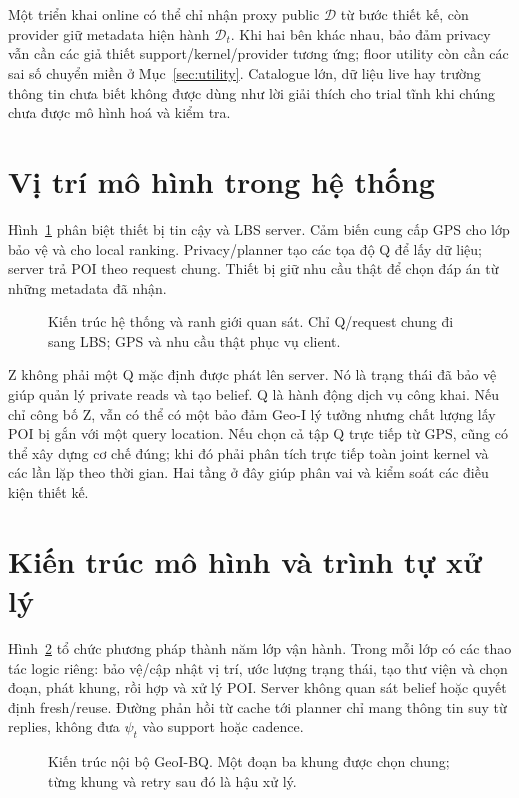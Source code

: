 Một triển khai online có thể chỉ nhận proxy public $\widehat{\mathcal D}$ từ bước thiết kế, còn
provider giữ metadata hiện hành $\mathcal D_t$. Khi hai bên khác nhau, bảo đảm privacy vẫn cần
các giả thiết support/kernel/provider tương ứng; floor utility còn cần các sai số chuyển miền ở
Mục~\ref{sec:utility}. Catalogue lớn, dữ liệu live hay trường thông tin chưa biết không được dùng
như lời giải thích cho trial tĩnh khi chúng chưa được mô hình hoá và kiểm tra.

\section{Vị trí mô hình trong hệ thống}
Hình~\ref{fig:system} phân biệt thiết bị tin cậy và LBS server. Cảm biến cung cấp GPS cho lớp bảo vệ
và cho local ranking. Privacy/planner tạo các tọa độ Q để lấy dữ liệu; server trả POI theo request
chung. Thiết bị giữ nhu cầu thật để chọn đáp án từ những metadata đã nhận.

\begin{figure}[htbp]
\centering\resizebox{\linewidth}{!}{}
\caption{Kiến trúc hệ thống và ranh giới quan sát. Chỉ Q/request chung đi sang LBS; GPS và nhu cầu thật phục vụ client.}
\label{fig:system}
\end{figure}

Z không phải một Q mặc định được phát lên server. Nó là trạng thái đã bảo vệ giúp quản lý private
reads và tạo belief. Q là hành động dịch vụ công khai. Nếu chỉ công bố Z, vẫn có thể có một bảo đảm
Geo-I lý tưởng nhưng chất lượng lấy POI bị gắn với một query location. Nếu chọn cả tập Q trực tiếp
từ GPS, cũng có thể xây dựng cơ chế đúng; khi đó phải phân tích trực tiếp toàn joint kernel và các
lần lặp theo thời gian. Hai tầng ở đây giúp phân vai và kiểm soát các điều kiện thiết kế.

\section{Kiến trúc mô hình và trình tự xử lý}\label{sec:model-workflow}
Hình~\ref{fig:model} tổ chức phương pháp thành năm lớp vận hành. Trong mỗi lớp có các thao tác logic
riêng: bảo vệ/cập nhật vị trí, ước lượng trạng thái, tạo thư viện và chọn đoạn, phát khung, rồi hợp và
xử lý POI. Server không quan sát belief hoặc quyết định fresh/reuse. Đường phản hồi từ cache tới
planner chỉ mang thông tin suy từ replies, không đưa $\psi_t$ vào support hoặc cadence.

\begin{figure}[htbp]
\centering\resizebox{\linewidth}{!}{}
\caption{Kiến trúc nội bộ GeoI-BQ. Một đoạn ba khung được chọn chung; từng khung và retry sau đó là hậu xử lý.}
\label{fig:model}
\end{figure}

